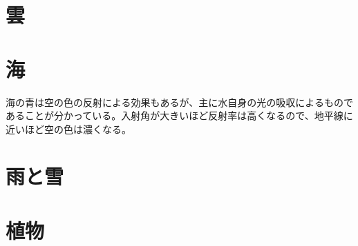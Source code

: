 \documentclass{jsarticle}
\begin{document}
	\section{雲}
	\section{海}
		海の青は空の色の反射による効果もあるが、主に水自身の光の吸収によるものであることが分かっている。入射角が大きいほど反射率は高くなるので、地平線に近いほど空の色は濃くなる。
	\section{雨と雪}
	\section{植物}
\end{document}
